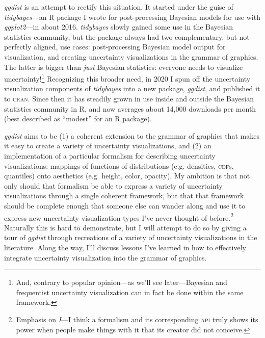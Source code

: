 \documentclass[journal]{vgtc}              %
\begin{document}
\textit{ggdist} is an attempt to rectify this situation. It started under the guise of \textit{tidybayes}---an R package I wrote for post-processing Bayesian models for use with \textit{ggplot2}---in about 2016. \textit{tidybayes} slowly gained some use in the Bayesian statistics community, but the package always had two complementary, but not perfectly aligned, use cases: post-processing Bayesian model output for visualization, and creating uncertainty visualizations in the grammar of graphics. The latter is bigger than \textit{just} Bayesian statistics: everyone needs to visualize uncertainty!\footnote{And, contrary to popular opinion---as we'll see later---Bayesian and frequentist uncertainty visualization can in fact be done within the same framework.} Recognizing this broader need, in 2020 I spun off the uncertainty visualization components of \textit{tidybayes} into a new package, \textit{ggdist}, and published it to \textsc{cran}. Since then it has steadily grown in use inside and outside the Bayesian statistics community in R, and now averages about 14,000 downloads per month (best described as ``modest'' for an R package).

\textit{ggdist} aims to be (1) a coherent extension to the grammar of graphics that makes it easy to create a variety of uncertainty visualizations, and (2) an implementation of a particular formalism for describing uncertainty visualizations: mappings of functions of distributions (e.g. densities, \textsc{cdf}s, quantiles) onto aesthetics (e.g. height, color, opacity). My ambition is that not only should that formalism be able to express a variety of uncertainty visualizations through a single coherent framework, but that that framework should be complete enough that someone else can wander along and use it to express new uncertainty visualization types I've never thought of before.\footnote{Emphasis on \textit{I}---I think a formalism and its corresponding \textsc{api} truly shows its power when people make things with it that its creator did not conceive.} Naturally this is hard to demonstrate, but I will attempt to do so by giving a tour of \textit{ggdist} through recreations of a variety of uncertainty visualizations in the literature. Along the way, I'll discuss lessons I've learned in how to effectively integrate uncertainty visualization into the grammar of graphics.

\end{document}
